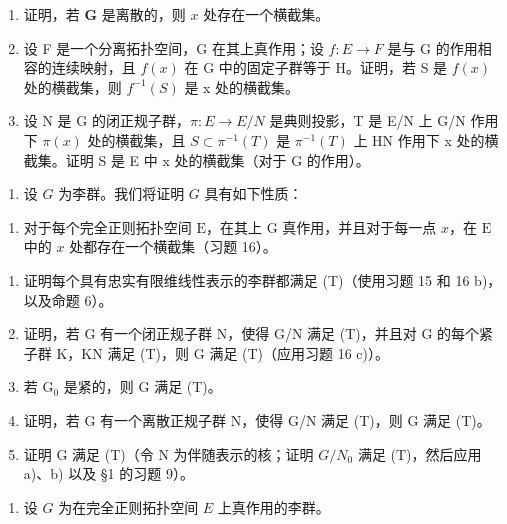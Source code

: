 \begin{enumerate}
\def\labelenumi{\alph{enumi})}
\item
  证明，若 \(\mathbf{G}\) 是离散的，则 \(x\) 处存在一个横截集。
\item
  设 F 是一个分离拓扑空间，G 在其上真作用；设 \(f : E \to F\) 是与 G 的作用相容的连续映射，且 \(f(x)\) 在 G 中的固定子群等于 H。证明，若 S 是 \(f(x)\) 处的横截集，则 \(f^{-1}(S)\) 是 x 处的横截集。
\item
  设 N 是 G 的闭正规子群，\(\pi: E \to E/N\) 是典则投影，T 是 E/N 上 G/N 作用下 \(\pi(x)\) 处的横截集，且 \(S \subset \pi^{-1}(T)\) 是 \(\pi^{-1}(T)\) 上 HN 作用下 x 处的横截集。证明 S 是 E 中 x 处的横截集（对于 G 的作用）。
\end{enumerate}

\begin{enumerate}
\def\labelenumi{\arabic{enumi})}
\setcounter{enumi}{16}
\tightlist
\item
  设 \(G\) 为李群。我们将证明 \(G\) 具有如下性质：
\end{enumerate}

\begin{enumerate}
\def\labelenumi{(\Alph{enumi})}
\setcounter{enumi}{19}
\tightlist
\item
  对于每个完全正则拓扑空间 \(\mathrm{E}\)，在其上 \(\mathrm{G}\) 真作用，并且对于每一点 \(x\)，在 \(\mathrm{E}\) 中的 \(x\) 处都存在一个横截集（习题 16）。
\end{enumerate}

\begin{enumerate}
\def\labelenumi{\alph{enumi})}
\item
  证明每个具有忠实有限维线性表示的李群都满足 (T)（使用习题 15 和 16 b)，以及命题 6）。
\item
  证明，若 G 有一个闭正规子群 N，使得 G/N 满足 (T)，并且对 G 的每个紧子群 K，KN 满足 (T)，则 G 满足 (T)（应用习题 16 c)）。
\item
  若 \(\mathrm{G}_0\) 是紧的，则 G 满足 (T)。
\item
  证明，若 G 有一个离散正规子群 N，使得 G/N 满足 (T)，则 G 满足 (T)。
\item
  证明 G 满足 (T)（令 N 为伴随表示的核；证明 \(G/N_{0}\) 满足 (T)，然后应用 a)、b) 以及 §1 的习题 9）。
\end{enumerate}

\begin{enumerate}
\def\labelenumi{\arabic{enumi})}
\setcounter{enumi}{17}
\tightlist
\item
  设 \(G\) 为在完全正则拓扑空间 \(E\) 上真作用的李群。
\end{enumerate}

